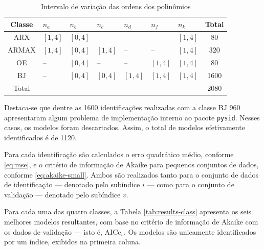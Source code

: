 \documentclass{ppgeesa}
\begin{document}
\begin{table}[!htbp]
  \centering
  \caption{Intervalo de variação das ordens dos polinômios}
  \label{tab:orders}
  \setlength{\extrarowheight}{1pt}
  \begin{tabularx}{\linewidth}{@{} c *{6}{C} c @{}}
    \toprule
    Classe & $n_a$    & $n_b$    & $n_c$    & $n_d$    & $n_f$    & $n_k$    & Total \\
    \midrule
    ARX    & $[1, 4]$ & $[0, 4]$ & --       & --       & --       & $[1, 4]$ & 80    \\
    ARMAX  & $[1, 4]$ & $[0, 4]$ & $[1, 4]$ & --       & --       & $[1, 4]$ & 320   \\
    OE     & --       & $[0, 4]$ & --       & --       & $[1, 4]$ & $[1, 4]$ & 80    \\
    BJ     & --       & $[0, 4]$ & $[0, 4]$ & $[1, 4]$ & $[1, 4]$ & $[1, 4]$ & 1600  \\
    \midrule
    Total  &          &          &          &          &          &          & 2080  \\
    \bottomrule
  \end{tabularx}
\end{table}

Destaca-se que dentre as 1600 identificações realizadas com a classe BJ 960 apresentaram algum problema de implementação interno ao pacote \texttt{pysid}.
Nesses casos, os modelos foram descartados.
Assim, o total de modelos efetivamente identificados é de 1120.

Para cada identificação são calculados o erro quadrático médio, conforme \eqref{eq:mse}, e o critério de informação de Akaike para pequenos conjuntos de dados, conforme \eqref{eq:akaike-small}.
Ambos são realizados tanto para o conjunto de dados de identificação --- denotado pelo subíndice $i$ --- como para o conjunto de validação --- denotado pelo subíndice $v$.

Para cada uma das quatro classes, a Tabela \ref{tab:results-class} apresenta os seis melhores modelos resultantes, com base no critério de informação de Akaike com os dados de validação --- isto é, $\text{AICc}_v$.
Os modelos são unicamente identificados por um índice, exibidos na primeira coluna.
\end{document}
